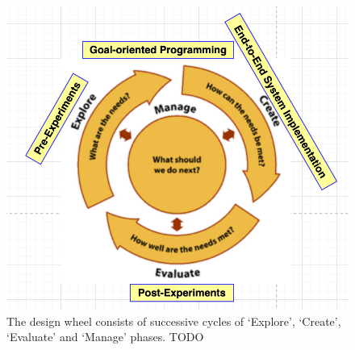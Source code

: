 \begin{figure}[h]
	\centering
	\includegraphics[width=0.7\linewidth]{figures/designwheel}
	\caption{The design wheel consists of successive cycles of `Explore', `Create', `Evaluate' and `Manage' phases. TODO}
	\label{fig:designwheel}
\end{figure}
